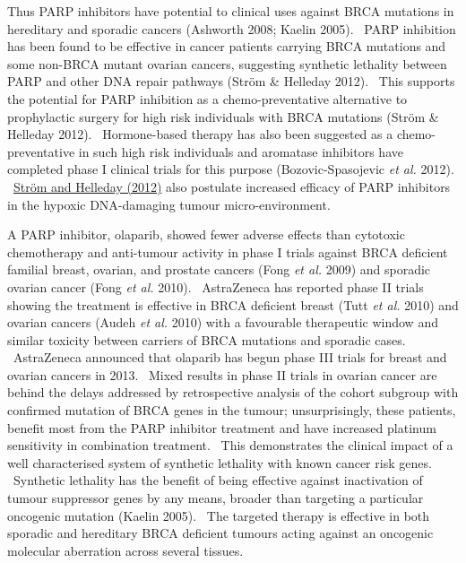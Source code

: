 Thus PARP inhibitors have potential to clinical uses against BRCA
mutations in hereditary and sporadic cancers (Ashworth 2008; Kaelin
2005). \ PARP inhibition has been found to be effective in cancer
patients carrying BRCA mutations and some non-BRCA mutant ovarian
cancers, suggesting synthetic lethality between PARP and other DNA
repair pathways (Str\"om \& Helleday 2012). \ This supports the
potential for PARP inhibition as a chemo-preventative alternative to
prophylactic surgery for high risk individuals with BRCA mutations
(Str\"om \& Helleday 2012). \ Hormone-based therapy has also been
suggested as a chemo-preventative in such high risk individuals and
aromatase inhibitors have completed phase I clinical trials for this
purpose (Bozovic-Spasojevic\textit{ et al.} 2012).
\ \hyperlink{ENREF91}{Str\"om and Helleday (2012)} also postulate
increased efficacy of PARP inhibitors in the hypoxic DNA-damaging
tumour micro-environment. \ 


A PARP inhibitor, olaparib, showed fewer adverse effects than cytotoxic
chemotherapy and anti-tumour activity in phase I trials against BRCA
deficient familial breast, ovarian, and prostate cancers (Fong\textit{
et al.} 2009) and sporadic ovarian cancer (Fong\textit{ et al.} 2010).
\ AstraZeneca has reported phase II trials showing the treatment is
effective in BRCA deficient breast (Tutt\textit{ et al.} 2010) and
ovarian cancers (Audeh\textit{ et al.} 2010) with a favourable
therapeutic window and similar toxicity between carriers of BRCA
mutations and sporadic cases. \ AstraZeneca announced that olaparib has
begun phase III trials for breast and ovarian cancers in 2013. \ Mixed
results in phase II trials in ovarian cancer are behind the delays
addressed by retrospective analysis of the cohort subgroup with
confirmed mutation of BRCA genes in the tumour; unsurprisingly, these
patients, benefit most from the PARP inhibitor treatment and have
increased platinum sensitivity in combination treatment. \ This
demonstrates the clinical impact of a well characterised system of
synthetic lethality with known cancer risk genes. \ Synthetic lethality
has the benefit of being effective against inactivation of tumour
suppressor genes by any means, broader than targeting a particular
oncogenic mutation (Kaelin 2005). \ The targeted therapy is effective
in both sporadic and hereditary BRCA deficient tumours acting against
an oncogenic molecular aberration across several tissues. \ 


